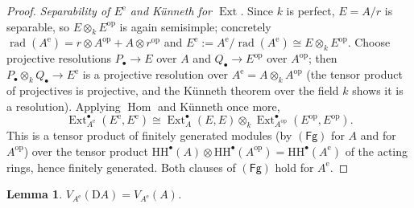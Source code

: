 \documentclass[11pt]{amsart}
\newtheorem{lemma}[theorem]{Lemma}
\theoremstyle{definition}
\newcommand{\HH}{\mathrm{HH}}
\newcommand{\D}{\mathrm{D}}
\newcommand{\Ext}{\operatorname{Ext}}
\newcommand{\Hom}{\operatorname{Hom}}
\newcommand{\rad}{\operatorname{rad}}
\newcommand{\Ae}{A^{\mathrm{e}}}
\newcommand{\kk}{k}
\newcommand{\Fg}{\mathsf{(Fg)}}
\begin{document}
\begin{proof}
\emph{Separability of $E^{\mathrm e}$ and K\"unneth for $\Ext$.} Since $\kk$ is
perfect, $E=A/r$ is separable, so $E\otimes_\kk E^{\mathrm{op}}$ is again
semisimple; concretely $\rad(\Ae)=r\otimes A^{\mathrm{op}}+A\otimes r^{\mathrm{op}}$
and $E^{\mathrm e}:=\Ae/\rad(\Ae)\cong E\otimes_\kk E^{\mathrm{op}}$. Choose
projective resolutions $P_\bullet\to E$ over $A$ and $Q_\bullet\to E^{\mathrm{op}}$
over $A^{\mathrm{op}}$; then $P_\bullet\otimes_\kk Q_\bullet\to E^{\mathrm e}$ is
a projective resolution over $\Ae=A\otimes_\kk A^{\mathrm{op}}$ (the tensor
product of projectives is projective, and the K\"unneth theorem over the field
$\kk$ shows it is a resolution). Applying $\Hom$ and K\"unneth once more,
\[
\Ext^\bullet_{\Ae}(E^{\mathrm e},E^{\mathrm e})\cong
\Ext^\bullet_A(E,E)\otimes_\kk\Ext^\bullet_{A^{\mathrm{op}}}(E^{\mathrm{op}},E^{\mathrm{op}}).
\]
This is a tensor product of finitely generated modules (by $\Fg$ for $A$ and
for $A^{\mathrm{op}}$) over the tensor product $\HH^\bullet(A)\otimes
\HH^\bullet(A^{\mathrm{op}})=\HH^\bullet(\Ae)$ of the acting rings, hence
finitely generated. Both clauses of $\Fg$ hold for $\Ae$.
\end{proof}

\begin{lemma}\label{lem:vda}
$V_{\Ae}(\D A)=V_{\Ae}(A)$.
\end{lemma}
\end{document}
